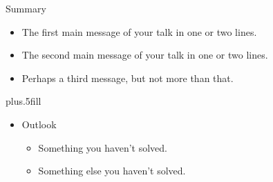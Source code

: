 \documentclass{beamer}
\begin{document}
\begin{frame}{Summary}

  \begin{itemize}
  \item
    The \alert{first main message} of your talk in one or two lines.
  \item
    The \alert{second main message} of your talk in one or two lines.
  \item
    Perhaps a \alert{third message}, but not more than that.
  \end{itemize}
  
  \vskip0pt plus.5fill
  \begin{itemize}
  \item
    Outlook
    \begin{itemize}
    \item
      Something you haven't solved.
    \item
      Something else you haven't solved.
    \end{itemize}
  \end{itemize}
\end{frame}
\end{document}

